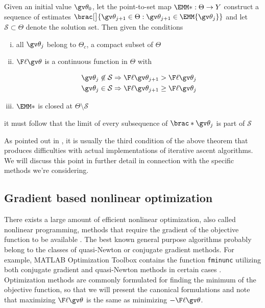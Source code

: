 \begin{theorem}
Given an initial value $\Th_0$, let the point-to-set map $\EMM*:\Theta\to Y$ construct a sequence
of estimates $\brac[\big]{\Th_{j+1}\in\Theta : \Th_{j+1}\in\EMM{\Th_j}}$ and let $\mathcal{S}\subset\Theta$ denote the solution
set. 
Then given the conditions
\begin{enumerate}[i)] \addtolength{\leftskip}{1cm} \itemsep1pt \parskip0pt 
	\item all $\Th_j$ belong to $\Theta_c$,  a compact subset of $\Theta$
	\item $\lLH$ is a continuous function in $\Theta$ with
\begin{eqspace}{5pt}{5pt}{1pt}{5pt}
\begin{align*}
	\Th_j \not\in \mathcal{S} \Rightarrow \lLH[\Th_{j+1}] > \lLH[\Th_j]\\  
	\Th_j \in \mathcal{S} \Rightarrow \lLH[\Th_{j+1}] \geq \lLH[\Th_j]  
\end{align*}
\end{eqspace}
	\item $\EMM*$ is closed at $\Theta\setminus\mathcal{S}$
\end{enumerate}
it must follow that the limit of every subsequence of $\brac*{\Th_j}$ is part of $\mathcal{S}$ 
\end{theorem}
As pointed out in \textcite{luenberger2008}, it is usually the third condition
of the above theorem that produces difficulties with actual implementations
of iterative ascent algorithms. We will discuss this point in further detail in connection
with the specific methods we're considering.
\subsection{Gradient based nonlinear optimization}\label{sec:grad}%

There exists a large amount of efficient nonlinear optimization,
also called nonlinear programming, methods that require the gradient of the 
objective function to be available \parencite{luenberger2008}.
The best known general purpose algorithms probably belong to the 
classes of quasi-Newton or conjugate gradient methods. 
For example, MATLAB Optimization Toolbox contains the function
\texttt{fminunc} utilizing both conjugate gradient and 
quasi-Newton methods in certain cases \parencite{optimizationtoolbox2012}.
Optimization methods are commonly formulated for finding the minimum of the
objective function, so that we will present the canonical formulations and note
that maximizing $\lLH$ is the same as minimizing $-\lLH$.


